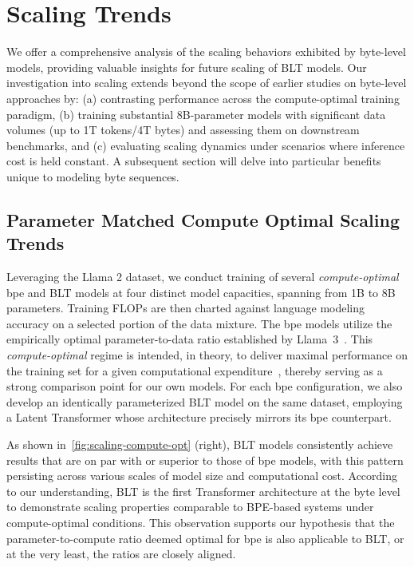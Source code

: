 \section{Scaling Trends}
\label{section:scaling}

We offer a comprehensive analysis of the scaling behaviors exhibited by byte-level models, providing valuable insights for future scaling of {\textsc BLT} models. Our investigation into scaling extends beyond the scope of earlier studies on byte-level approaches by: (a) contrasting performance across the compute-optimal training paradigm, (b) training substantial 8B-parameter models with significant data volumes (up to 1T tokens/4T bytes) and assessing them on downstream benchmarks, and (c) evaluating scaling dynamics under scenarios where inference cost is held constant. A subsequent section will delve into particular benefits unique to modeling byte sequences.

\subsection{Parameter Matched Compute Optimal Scaling Trends}
\label{section:parameter-matched-scaling}
Leveraging the Llama 2 dataset, we conduct training of several \textit{compute-optimal} bpe and {\textsc BLT} models at four distinct model capacities, spanning from 1B to 8B parameters. Training FLOPs are then charted against language modeling accuracy on a selected portion of the data mixture. The bpe models utilize the empirically optimal parameter-to-data ratio established by Llama~3~\citep{dubey2024llama}. This \textit{compute-optimal} regime is intended, in theory, to deliver maximal performance on the training set for a given computational expenditure~\citep{hoffmann2022training}, thereby serving as a strong comparison point for our own models. For each bpe configuration, we also develop an identically parameterized {\textsc BLT} model on the same dataset, employing a Latent Transformer whose architecture precisely mirrors its bpe counterpart.

As shown in~\autoref{fig:scaling-compute-opt} (right), {\textsc BLT} models consistently achieve results that are on par with or superior to those of bpe models, with this pattern persisting across various scales of model size and computational cost. According to our understanding, {\textsc BLT} is the first Transformer architecture at the byte level to demonstrate scaling properties comparable to BPE-based systems under compute-optimal conditions. This observation supports our hypothesis that the parameter-to-compute ratio deemed optimal for bpe is also applicable to {\textsc BLT}, or at the very least, the ratios are closely aligned.

